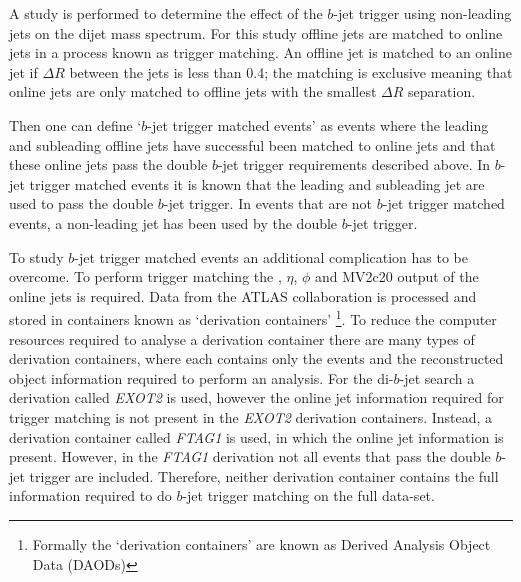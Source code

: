 A study is performed to determine the effect of the $b$-jet trigger using non-leading jets on the dijet mass spectrum.
For this study offline jets are matched to online jets in a process known as trigger matching.
An offline jet is matched to an online jet if $\Delta R$
between the jets is less than 0.4;
the matching is exclusive meaning that online jets are only matched to offline jets with the smallest $\Delta R$ separation.
%
%
%

Then one can define `$b$-jet trigger matched events' as events where
the leading and subleading offline jets have successful been matched to online jets
and that these online jets pass the double $b$-jet trigger requirements described above.
In $b$-jet trigger matched events it is known that the leading and subleading jet are used to pass the double $b$-jet trigger.
In events that are not $b$-jet trigger matched events, a non-leading jet has been used by the double $b$-jet trigger.

To study $b$-jet trigger matched events an additional complication has to be overcome.
To perform trigger matching the \pT, $\eta$, $\phi$ and MV2c20 output of the online jets is required.
Data from the ATLAS collaboration is processed and stored in containers known as `derivation containers'
\footnote{Formally the `derivation containers' are known as Derived Analysis Object Data (DAODs)}.
To reduce the computer resources required to analyse a derivation container
there are many types of derivation containers,
where each contains only the events and the reconstructed object information required to perform an analysis.
For the di-$b$-jet search a derivation called \textit{EXOT2} is used,
however the online jet information required for trigger matching is not present in the \textit{EXOT2} derivation containers.
Instead, a derivation container called \textit{FTAG1} is used, in which the online jet information is present.
However, in the \textit{FTAG1} derivation not all events that pass the double $b$-jet trigger are included.
Therefore, neither derivation container contains the full information required to do $b$-jet trigger matching on the full \lm{} data-set.

